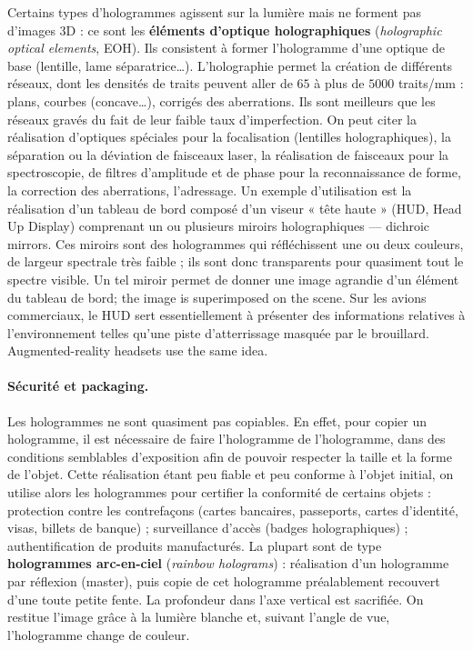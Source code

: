 Certains types d'hologrammes agissent sur la lumière mais ne forment pas
d'images 3D : ce sont les \textbf{éléments d'optique holographiques}
(\textit{holographic optical elements}, EOH). Ils consistent à former
l'hologramme d'une optique de base (lentille, lame séparatrice…). L'holographie
permet la création de différents réseaux, dont les densités de traits peuvent
aller de $65$ à plus de $5000$ traits/mm : plans, courbes (concave…), corrigés
des aberrations. Ils sont meilleurs que les réseaux gravés du fait de leur
faible taux d'imperfection. On peut citer la réalisation d'optiques spéciales
pour la focalisation (lentilles holographiques), la séparation ou la déviation
de faisceaux laser, la réalisation de faisceaux pour la spectroscopie, de filtres
d'amplitude et de phase pour la reconnaissance de forme, la correction des
aberrations, l'adressage. Un exemple d'utilisation est la réalisation d'un
tableau de bord composé d'un viseur « tête haute » (HUD, Head Up Display)
comprenant un ou plusieurs miroirs holographiques --- dichroic mirrors. Ces
miroirs sont des hologrammes qui réfléchissent une ou deux couleurs, de largeur
spectrale très faible ; ils sont donc transparents pour quasiment tout le
spectre visible. Un tel miroir permet de donner une image agrandie d'un élément
du tableau de bord; the image is superimposed on the scene. Sur les avions
commerciaux, le HUD sert essentiellement à présenter des informations relatives
à l'environnement telles qu'une piste d'atterrissage masquée par le brouillard.
Augmented-reality headsets use the same idea.

\paragraph{Sécurité et packaging.}
Les hologrammes ne sont quasiment pas copiables. En effet, pour copier un
hologramme, il est nécessaire de faire l'hologramme de l'hologramme, dans des
conditions semblables d'exposition afin de pouvoir respecter la taille et la
forme de l'objet. Cette réalisation étant peu fiable et peu conforme à l'objet
initial, on utilise alors les hologrammes pour certifier la conformité de
certains objets : protection contre les contrefaçons (cartes bancaires,
passeports, cartes d'identité, visas, billets de banque) ; surveillance d'accès
(badges holographiques) ; authentification de produits manufacturés. La plupart
sont de type \textbf{hologrammes arc-en-ciel} (\textit{rainbow holograms}) :
réalisation d'un hologramme par réflexion (master), puis copie de cet hologramme
préalablement recouvert d'une toute petite fente. La profondeur dans l'axe
vertical est sacrifiée. On restitue l'image grâce à la lumière blanche et,
suivant l'angle de vue, l'hologramme change de couleur.

